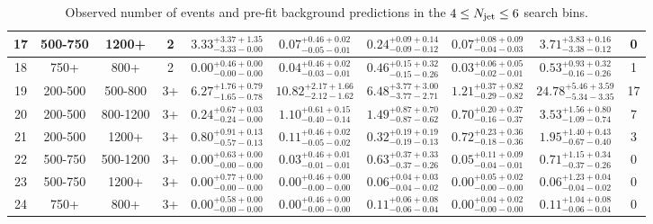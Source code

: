 \documentclass[11pt, oneside]{article}   	%
\newcommand{\njets}{\ensuremath{N_{\rm jet}}\xspace}
\begin{document}
\begin{table}
{\begin{tabular}{ |c|c|c|c||c|c|c|c||c|c| }
17 & 500-750 & 1200+ & 2 & $3.33^{+3.37+1.35}_{-3.33-0.00}$ & $0.07^{+0.46+0.02}_{-0.05-0.01}$ & $0.24^{+0.09+0.14}_{-0.09-0.12}$ & $0.07^{+0.08+0.09}_{-0.04-0.03}$ & $3.71^{+3.83+0.16}_{-3.38-0.12}$ & 0 \\ \hline
18 & 750+ & 800+ & 2 & $0.00^{+0.46+0.00}_{-0.00-0.00}$ & $0.04^{+0.46+0.02}_{-0.03-0.01}$ & $0.46^{+0.15+0.32}_{-0.15-0.26}$ & $0.03^{+0.06+0.05}_{-0.02-0.01}$ & $0.53^{+0.93+0.32}_{-0.16-0.26}$ & 1 \\ \hline
19 & 200-500 & 500-800 & 3+ & $6.27^{+1.76+0.79}_{-1.65-0.78}$ & $10.82^{+2.17+1.66}_{-2.12-1.62}$ & $6.48^{+3.77+3.00}_{-3.77-2.71}$ & $1.21^{+0.37+0.82}_{-0.29-0.82}$ & $24.78^{+5.46+3.59}_{-5.34-3.35}$ & 17 \\ \hline
20 & 200-500 & 800-1200 & 3+ & $0.24^{+0.67+0.03}_{-0.24-0.00}$ & $1.10^{+0.61+0.15}_{-0.40-0.14}$ & $1.49^{+0.87+0.70}_{-0.87-0.62}$ & $0.70^{+0.20+0.37}_{-0.16-0.37}$ & $3.53^{+1.56+0.80}_{-1.09-0.74}$ & 7 \\ \hline
21 & 200-500 & 1200+ & 3+ & $0.80^{+0.91+0.13}_{-0.57-0.13}$ & $0.11^{+0.46+0.02}_{-0.05-0.02}$ & $0.32^{+0.19+0.19}_{-0.19-0.13}$ & $0.72^{+0.23+0.36}_{-0.18-0.36}$ & $1.95^{+1.40+0.43}_{-0.67-0.40}$ & 3 \\ \hline
22 & 500-750 & 500-1200 & 3+ & $0.00^{+0.63+0.00}_{-0.00-0.00}$ & $0.03^{+0.46+0.01}_{-0.01-0.01}$ & $0.63^{+0.37+0.33}_{-0.37-0.26}$ & $0.05^{+0.11+0.09}_{-0.04-0.01}$ & $0.71^{+1.15+0.34}_{-0.37-0.26}$ & 0 \\ \hline
23 & 500-750 & 1200+ & 3+ & $0.00^{+0.77+0.00}_{-0.00-0.00}$ & $0.00^{+0.46+0.00}_{-0.00-0.00}$ & $0.06^{+0.04+0.03}_{-0.04-0.02}$ & $0.00^{+0.05+0.02}_{-0.00-0.00}$ & $0.06^{+1.23+0.04}_{-0.04-0.02}$ & 0 \\ \hline
24 & 750+ & 800+ & 3+ & $0.00^{+0.58+0.00}_{-0.00-0.00}$ & $0.00^{+0.46+0.00}_{-0.00-0.00}$ & $0.11^{+0.06+0.08}_{-0.06-0.04}$ & $0.00^{+0.04+0.02}_{-0.00-0.00}$ & $0.11^{+1.04+0.08}_{-0.06-0.04}$ & 0 \\ \hline
\end{tabular}
}
\caption{Observed number of events and pre-fit background predictions in the $4\leq\njets\leq6$ search bins.}
\end{table}
\end{document}

